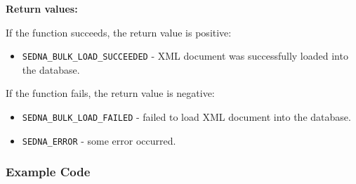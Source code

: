 \documentclass[a4paper,12pt]{article}
\newenvironment{citemize}
{\begin{itemize}
  \setlength{\itemsep}{0pt}
  \setlength{\parskip}{0pt}
  \setlength{\parsep}{0pt}}
{\end{itemize}}
\begin{document}
\noindent
\textbf{Return values:}

\medskip

\noindent
If the function succeeds, the return value is positive:

\begin{citemize}
\item\verb!SEDNA_BULK_LOAD_SUCCEEDED! - XML document was successfully loaded
into the database.
\end{citemize}

\noindent
If the function fails, the return value is negative:

\begin{citemize}
\item\verb!SEDNA_BULK_LOAD_FAILED! - failed to load XML document into the
database.
\item\verb!SEDNA_ERROR! - some error occurred.
\end{citemize}


\subsubsection{Example Code}
\end{document}
